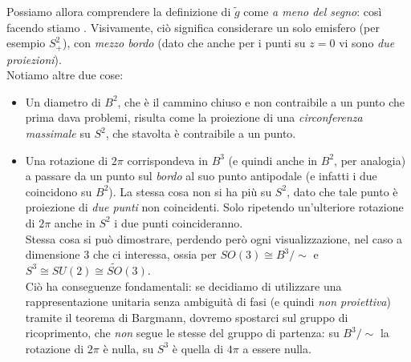 \documentclass[../../FisicaTeorica.tex]{subfiles}
\begin{document}
Possiamo allora comprendere la definizione di $\tilde{g}$ come \textit{a meno del segno}: così facendo stiamo . Visivamente, ciò significa considerare un solo emisfero (per esempio $S^2_+$), con \textit{mezzo bordo} (dato che anche per i punti su $z=0$ vi sono \textit{due proiezioni}).\\
Notiamo altre due cose:
\begin{itemize}
\item Un diametro di $B^2$, che è il cammino chiuso e non contraibile a un punto che prima dava problemi, risulta come la proiezione di una \textit{circonferenza massimale} su $S^2$, che stavolta è contraibile a un punto.
\item Una rotazione di $2\pi$ corrispondeva in $B^3$ (e quindi anche in $B^2$, per analogia) a passare da un punto sul \textit{bordo} al suo punto antipodale (e infatti i due coincidono su $B^2$). La stessa cosa non si ha più su $S^2$, dato che tale punto è proiezione di \textit{due punti} non coincidenti. Solo ripetendo un'ulteriore rotazione di $2\pi$ anche in $S^2$ i due punti coincideranno.\\
Stessa cosa si può dimostrare, perdendo però ogni visualizzazione, nel caso a dimensione $3$ che ci interessa, ossia per $SO(3)\cong B^3/\sim$ e $S^3 \cong SU(2) \cong \widetilde{SO}(3)$.\\
Ciò ha conseguenze fondamentali: se decidiamo di utilizzare una rappresentazione unitaria senza ambiguità di fasi (e quindi \textit{non proiettiva}) tramite il teorema di Bargmann, dovremo spostarci sul gruppo di ricoprimento, che \textit{non} segue le stesse  del gruppo di partenza: su $B^3/\sim$ la rotazione di $2\pi$ è nulla, su $S^3$ è quella di $4\pi$ a essere nulla.
\end{itemize}
\end{document}
